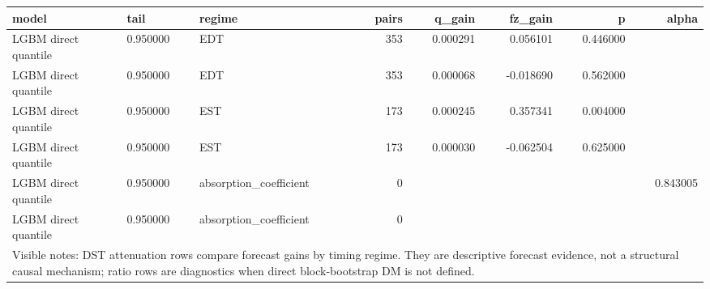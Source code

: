 \begin{tabular}{lllrrrrr}
\toprule
model & tail & regime & pairs & q_gain & fz_gain & p & alpha \\
\midrule
LGBM direct quantile & 0.950000 & EDT & 353 & 0.000291 & 0.056101 & 0.446000 &  \\
LGBM direct quantile & 0.950000 & EDT & 353 & 0.000068 & -0.018690 & 0.562000 &  \\
LGBM direct quantile & 0.950000 & EST & 173 & 0.000245 & 0.357341 & 0.004000 &  \\
LGBM direct quantile & 0.950000 & EST & 173 & 0.000030 & -0.062504 & 0.625000 &  \\
LGBM direct quantile & 0.950000 & absorption\_coefficient & 0 &  &  &  & 0.843005 \\
LGBM direct quantile & 0.950000 & absorption\_coefficient & 0 &  &  &  &  \\
\midrule
\multicolumn{8}{l}{\footnotesize Visible notes: DST attenuation rows compare forecast gains by timing regime. They are descriptive forecast evidence, not a structural causal mechanism; ratio rows are diagnostics when direct block-bootstrap DM is not defined.} \\
\bottomrule
\end{tabular}
